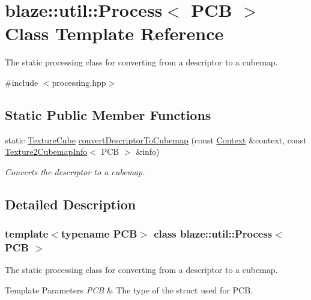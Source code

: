 \hypertarget{classblaze_1_1util_1_1Process}{}\section{blaze\+:\+:util\+:\+:Process$<$ P\+CB $>$ Class Template Reference}
\label{classblaze_1_1util_1_1Process}


The static processing class for converting from a descriptor to a cubemap.  




{\ttfamily \#include $<$processing.\+hpp$>$}

\subsection*{Static Public Member Functions}
\begin{DoxyCompactItemize}
\item 
static \hyperlink{classblaze_1_1TextureCube}{Texture\+Cube} \hyperlink{classblaze_1_1util_1_1Process_aacdf156de09d7da2925e6033367d07a2}{convert\+Descriptor\+To\+Cubemap} (const \hyperlink{classblaze_1_1Context}{Context} \&context, const \hyperlink{structblaze_1_1util_1_1Texture2CubemapInfo}{Texture2\+Cubemap\+Info}$<$ P\+CB $>$ \&info)
\begin{DoxyCompactList}\small\item\em Converts the descriptor to a cubemap. \end{DoxyCompactList}\end{DoxyCompactItemize}


\subsection{Detailed Description}
\subsubsection*{template$<$typename P\+CB$>$\newline
class blaze\+::util\+::\+Process$<$ P\+C\+B $>$}

The static processing class for converting from a descriptor to a cubemap. 


\begin{DoxyTemplParams}{Template Parameters}
{\em P\+CB} & The type of the struct used for P\+CB. \\
\hline
\end{DoxyTemplParams}


